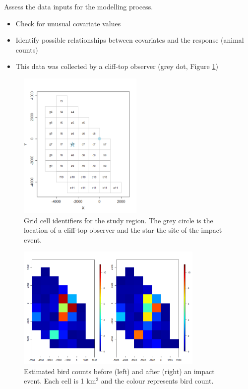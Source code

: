 \begin{frame}[fragile]
Assess the data inputs for the modelling process. 
\begin{itemize}
\item Check for unusual covariate values
\item Identify possible relationships between covariates and the response (animal counts)
\item This data was collected by a cliff-top observer (grey dot, Figure \ref{fig:gridcells})
\end{itemize}


\begin{figure}[h!]
  \centering
  \includegraphics[width=6cm]{bc/vpgridcells.png}
\caption{Grid cell identifiers for the study region.  The grey circle is the location of a cliff-top observer and the star the site of the impact event.}
\label{fig:gridcells}
\end{figure}
\end{frame}

\begin{frame}
\begin{figure}[h!]
\centering
  \includegraphics[width=9cm]{bc/birds.png}
\caption{Estimated bird counts before (left) and after (right) an impact event.  Each cell is 1 km$^2$ and the colour represents bird count.}
\label{fig:rawnhats}
\end{figure}
\end{frame}


